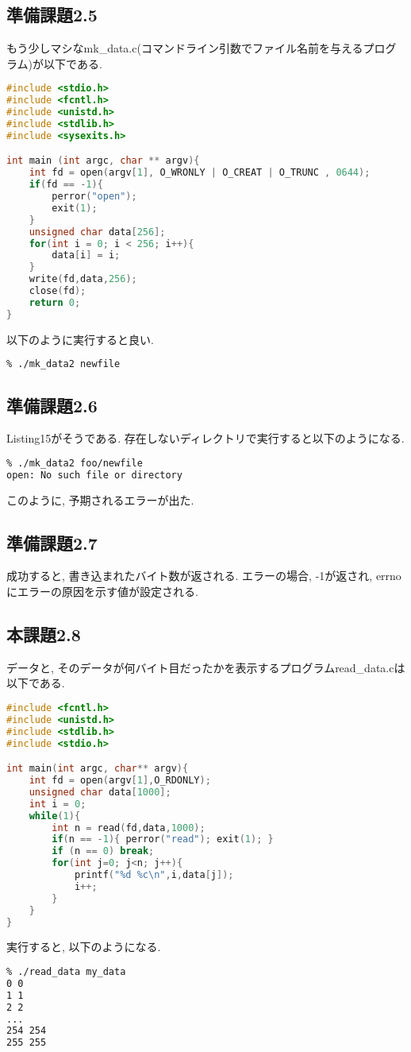 \documentclass{ltjsarticle}
\begin{document}
\subsection{準備課題2.5}
もう少しマシなmk\_data.c(コマンドライン引数でファイル名前を与えるプログラム)が以下である. 
\begin{lstlisting}[caption=mk\_data2.c,language=C]
#include <stdio.h>
#include <fcntl.h>
#include <unistd.h>
#include <stdlib.h>
#include <sysexits.h>

int main (int argc, char ** argv){
    int fd = open(argv[1], O_WRONLY | O_CREAT | O_TRUNC , 0644);
    if(fd == -1){
        perror("open");
        exit(1);
    }
    unsigned char data[256];
    for(int i = 0; i < 256; i++){
        data[i] = i;
    }
    write(fd,data,256);
    close(fd);
    return 0;
}
\end{lstlisting}
以下のように実行すると良い. 
\begin{lstlisting}[caption=mk\_data2.c 実効,language=bash]
% gcc mk_data2.c -o mk_data2
% ./mk_data2 newfile
\end{lstlisting}

\subsection{準備課題2.6}
Listing15がそうである. 存在しないディレクトリで実行すると以下のようになる. 
\begin{lstlisting}[caption=mk\_data2 存在しないディレクトリで実効,language=bash]
% gcc mk_data2.c -o mk_data2
% ./mk_data2 foo/newfile
open: No such file or directory
\end{lstlisting}
このように, 予期されるエラーが出た. 

\subsection{準備課題2.7}
成功すると, 書き込まれたバイト数が返される. エラーの場合, -1が返され, errnoにエラーの原因を示す値が設定される. 

\subsection{本課題2.8}
データと, そのデータが何バイト目だったかを表示するプログラムread\_data.cは以下である. 
\begin{lstlisting}[caption=read\_data.c,language=C]
#include <fcntl.h>
#include <unistd.h>
#include <stdlib.h>
#include <stdio.h>

int main(int argc, char** argv){
    int fd = open(argv[1],O_RDONLY);
    unsigned char data[1000];
    int i = 0;
    while(1){
        int n = read(fd,data,1000);
        if(n == -1){ perror("read"); exit(1); }
        if (n == 0) break;
        for(int j=0; j<n; j++){
            printf("%d %c\n",i,data[j]);
            i++;
        }
    }
}
\end{lstlisting}
実行すると, 以下のようになる. 
\begin{lstlisting}[caption=read\_data.c 実行,language=bash]
% gcc read_data.c -o read_data
% ./read_data my_data
0 0
1 1
2 2
...
254 254
255 255
\end{lstlisting}
\end{document}
